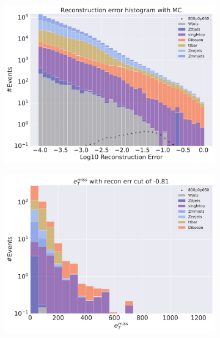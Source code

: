 \begin{figure}[H]
    \centering
    \begin{subfigure}{.40\textwidth}
        \includegraphics[width=\textwidth]{Figures/AE_testing/small/2lep/b_data_recon_big_rm3_feats_sig_800p0p050_.pdf}
        \caption{ }
        \label{fig:AE_2lep_small_800_3}
    \end{subfigure}
    \hfill
    \begin{subfigure}{.40\textwidth}
        \includegraphics[width=\textwidth]{Figures/AE_testing/small/2lep/b_data_recon_big_rm3_feats_sig_800p0p050_recon_errcut_-0.81.pdf}
        \caption{}
        \label{fig:AE_2lep_small_etmiss_800_3}
    \end{subfigure}

\end{figure}
